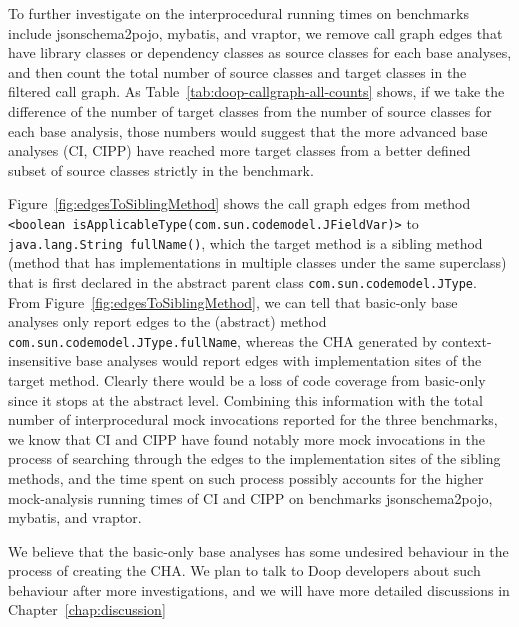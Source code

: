 To further investigate on the interprocedural running times on benchmarks include jsonschema2pojo, mybatis, and vraptor, we remove call graph edges that have library classes or dependency classes as source classes for each base analyses, and then count the total number of source classes and target classes in the filtered call graph. As Table~\ref{tab:doop-callgraph-all-counts} shows, if we take the difference of the number of target classes from the number of source classes for each base analysis, those numbers would suggest that the more advanced base analyses (CI, CIPP) have reached more target classes from a better defined subset of source classes strictly in the benchmark. 

Figure~\ref{fig:edgesToSiblingMethod} shows the call graph edges from method \texttt{<boolean isApplicableType(com.sun.codemodel.JFieldVar)>} to \texttt{java.lang.String fullName()}, which the target method is a sibling method (method that has implementations in multiple classes under the same superclass) that is first declared in the abstract parent class \texttt{com.sun.codemodel.JType}. From Figure~\ref{fig:edgesToSiblingMethod}, we can tell that basic-only base analyses only report edges to the (abstract) method \texttt{com.sun.codemodel.JType.fullName}, whereas the CHA generated by context-insensitive base analyses would report edges with implementation sites of the target method. Clearly there would be a loss of code coverage from basic-only since it stops at the abstract level. Combining this information with the total number of interprocedural mock invocations reported for the three benchmarks, we know that CI and CIPP have found notably more mock invocations in the process of searching through the edges to the implementation sites of the sibling methods, and the time spent on such process possibly accounts for the higher mock-analysis running times of CI and CIPP on benchmarks jsonschema2pojo, mybatis, and vraptor.

We believe that the basic-only base analyses has some undesired behaviour in the process of creating the CHA. We plan to talk to Doop developers about such behaviour after more investigations, and we will have more detailed discussions in Chapter~\ref{chap:discussion}


